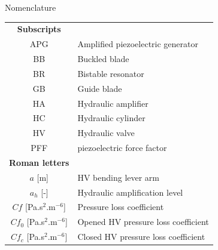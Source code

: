 \documentclass[3p,twocolumn,preprint]{elsarticle}
\begin{document}
\begin{table}
\begin{large}
	\begin{center}
		Nomenclature	\\
		\noindent\makebox[\linewidth]{\rule{\textwidth}{0.4pt}}
	\end{center}
\end{large}		
\begin{minipage}{.5\textwidth}
	\begin{tabular}{ c  m{6cm} }
		\textbf{Subscripts}      &                                                         \\
		APG                      & Amplified piezoelectric generator                       \\
		BB                       & Buckled blade                                           \\
		BR                       & Bistable resonator                                      \\
		GB                       & Guide blade                                             \\
		HA                       & Hydraulic amplifier                                     \\
		HC                       & Hydraulic cylinder                                      \\
		HV                       & Hydraulic valve                                         \\
		PFF						 & piezoelectric force factor  \\
		\textbf{Roman letters}   &                                                         \\
		$a$ [m]                  & HV bending lever arm                                    \\
		$a_h$ [-]                & Hydraulic amplification level                           \\
		$Cf$ [Pa.s$^2$.m$^{-6}$]         & Pressure loss coefficient                               \\
		$Cf_0$ [Pa.s$^2$.m$^{-6}$]       & Opened HV pressure loss coefficient                     \\
		$Cf_c$ [Pa.s$^2$.m$^{-6}$]       & Closed HV pressure loss coefficient                     \\

\end{tabular}
\end{minipage}
\end{table}
\end{document}
